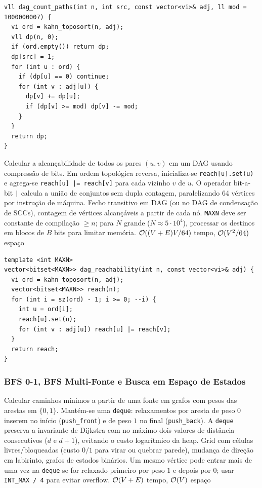 \begin{lstlisting}
vll dag_count_paths(int n, int src, const vector<vi>& adj, ll mod = 1000000007) {
  vi ord = kahn_toposort(n, adj);
  vll dp(n, 0);
  if (ord.empty()) return dp;
  dp[src] = 1;
  for (int u : ord) {
    if (dp[u] == 0) continue;
    for (int v : adj[u]) {
      dp[v] += dp[u];
      if (dp[v] >= mod) dp[v] -= mod;
    }
  }
  return dp;
}
\end{lstlisting}

\algobox
  {Calcular a alcançabilidade de todos os pares $(u, v)$ em um DAG usando compressão de bits.}
  {Em ordem topológica reversa, inicializa-se \texttt{reach[u].set(u)} e agrega-se \texttt{reach[u] |= reach[v]} para cada vizinho $v$ de $u$.}
  {O operador bit-a-bit \texttt{|} calcula a união de conjuntos sem dupla contagem, paralelizando 64 vértices por instrução de máquina.}
  {Fecho transitivo em DAG (ou no DAG de condensação de SCCs), contagem de vértices alcançáveis a partir de cada nó.}
  {\texttt{MAXN} deve ser constante de compilação $\ge n$; para $N$ grande ($N \approx 5 \cdot 10^4$), processar os destinos em blocos de $B$ bits para limitar memória.}
  {$\mathcal{O}((V + E)V / 64)$ tempo, $\mathcal{O}(V^2 / 64)$ espaço}

\begin{lstlisting}
template <int MAXN>
vector<bitset<MAXN>> dag_reachability(int n, const vector<vi>& adj) {
  vi ord = kahn_toposort(n, adj);
  vector<bitset<MAXN>> reach(n);
  for (int i = sz(ord) - 1; i >= 0; --i) {
    int u = ord[i];
    reach[u].set(u);
    for (int v : adj[u]) reach[u] |= reach[v];
  }
  return reach;
}
\end{lstlisting}

\subsubsection{BFS 0-1, BFS Multi-Fonte e Busca em Espaço de Estados}
\algobox
  {Calcular caminhos mínimos a partir de uma fonte em grafos com pesos das arestas em $\{0, 1\}$.}
  {Mantém-se uma \texttt{deque}: relaxamentos por aresta de peso $0$ inserem no início (\texttt{push\_front}) e de peso $1$ no final (\texttt{push\_back}).}
  {A \texttt{deque} preserva a invariante de Dijkstra com no máximo dois valores de distância consecutivos ($d$ e $d+1$), evitando o custo logarítmico da heap.}
  {Grid com células livres/bloqueadas (custo $0/1$ para virar ou quebrar parede), mudança de direção em labirinto, grafos de estados binários.}
  {Um mesmo vértice pode entrar mais de uma vez na \texttt{deque} se for relaxado primeiro por peso $1$ e depois por $0$; usar \texttt{INT\_MAX / 4} para evitar overflow.}
  {$\mathcal{O}(V + E)$ tempo, $\mathcal{O}(V)$ espaço}

